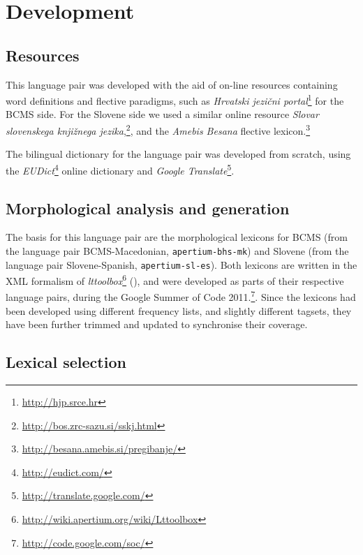 \section{Development}

\subsection{Resources}
This language pair was developed with the
aid of on-line resources containing word definitions and flective
paradigms, such as \emph{Hrvatski jezični
  portal}\footnote{\url{http://hjp.srce.hr}} for the BCMS side. For
the Slovene side we used a similar online resource \emph{Slovar
  slovenskega knjižnega
  jezika},\footnote{\url{http://bos.zrc-sazu.si/sskj.html}}, and the
\emph{Amebis Besana} flective
lexicon.\footnote{\url{http://besana.amebis.si/pregibanje/}}

The bilingual dictionary for the language pair was developed from scratch,
using the \emph{EUDict}\footnote{\url{http://eudict.com/}} online
dictionary and \emph{Google
  Translate}\footnote{\url{http://translate.google.com/}}.

\subsection{Morphological analysis and generation}
The basis for this language pair are the morphological
lexicons for BCMS (from
the language pair BCMS-Macedonian, {\small{\tt apertium-bhs-mk}}) and Slovene (from the
language pair Slovene-Spanish, {\small{\tt apertium-sl-es}}). Both
lexicons are written in the XML formalism of
\emph{lttoolbox}\footnote{\url{http://wiki.apertium.org/wiki/Lttoolbox}}
(\citealp{rojas2005construccion}), and were developed as parts of
their respective language pairs, during the Google Summer of Code
2011.\footnote{\url{http://code.google.com/soc/}}. Since the lexicons
had been developed using different frequency lists, and slightly
different tagsets, they have been further trimmed and updated to
synchronise their coverage.







\subsection{Lexical selection}


